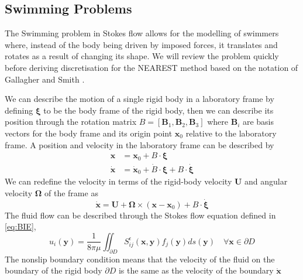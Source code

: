 \FloatBarrier
\subsection{Swimming Problems} \label{sec:swimming}
The Swimming problem in Stokes flow allows for the modelling of swimmers where, instead of the body being driven by imposed forces, it translates and rotates as a result of changing its shape. We will review the problem quickly before deriving discretisation for the NEAREST method based on the notation of Gallagher and Smith \cite{Gallagher2018MeshfreeCells}.

We can describe the motion of a single rigid body in a laboratory frame by defining $\bm{\xi}$ to be the body frame of the rigid body, then we can describe its position through the rotation matrix $B = [\bm{B}_1,\bm{B}_2,\bm{B}_3]$ where $\bm{B}_i$ are basis vectors for the body frame and its origin point $\bm{x}_0$ relative to the laboratory frame. A position and velocity in the laboratory frame can be described by
\begin{equation*}
\begin{aligned}
    \bm{x} &= \bm{x}_0 + B\cdot\bm{\xi} \\
    \dot{\bm{x}} &= \dot{\bm{x}}_0 + \dot{B}\cdot\bm{\xi} + B\cdot\dot{\bm{\xi}}
\end{aligned}
\end{equation*}
We can redefine the velocity in terms of the rigid-body velocity $\bm{U}$ and angular velocity $\bm{\Omega}$ of the frame as
\begin{equation*}
    \dot{\bm{x}} = \bm{U} + \bm{\Omega}\times (\bm{x}-\bm{x}_0) + B\cdot\dot{\bm{\xi}}
\end{equation*}
The fluid flow can be described through the Stokes flow equation defined in \cref{eq:BIE},
\begin{equation*}
    u_i(\bm{y}) = \frac{1}{8 \pi \mu} \iint_{\partial D} S_{i j}^{\epsilon}\left(\bm{x}, \bm{y}\right) f_{j}(\bm{y}) d s(\bm{y}) \quad \forall \bm{x}\in\partial D
\end{equation*}
The nonslip boundary condition means that the velocity of the fluid on the boundary of the rigid body $\partial D$ is the same as the velocity of the boundary $\dot{\bm{x}}$

